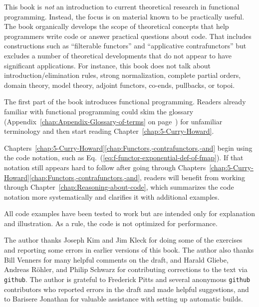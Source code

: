 This book is \emph{not} an introduction to current theoretical research
in functional programming. Instead, the focus is on material known
to be practically useful. The book organically develops the scope
of theoretical concepts that help programmers write code or answer
practical questions about code. That includes constructions such as
\textsf{``}filterable functors\textsf{''} and \textsf{``}applicative contrafunctors\textsf{''} but
excludes a number of theoretical developments that do not appear to
have significant applications. For instance, this book does not talk
about introduction/elimination rules, strong normalization, complete
partial orders, domain theory, model theory, adjoint functors, co-ends,
pullbacks, or topoi.

The first part of the book introduces functional programming. Readers
already familiar with functional programming could skim the glossary
(Appendix~\ref{chap:Appendix-Glossary-of-terms} on page~\pageref{chap:Appendix-Glossary-of-terms})
for unfamiliar terminology and then start reading Chapter~\ref{chap:5-Curry-Howard}.

Chapters~\ref{chap:5-Curry-Howard}\textendash \ref{chap:Functors,-contrafunctors,-and}
begin using the code notation, such as Eq.~(\ref{eq:f-functor-exponential-def-of-fmap}).
If that notation still appears hard to follow after going through
Chapters~\ref{chap:5-Curry-Howard}\textendash \ref{chap:Functors,-contrafunctors,-and},
readers will benefit from working through Chapter~\ref{chap:Reasoning-about-code},
which summarizes the code notation more systematically and clarifies
it with additional examples.

All code examples have been tested to work but are intended only for
explanation and illustration. As a rule, the code is not optimized
for performance.

The author thanks Joseph Kim and Jim Kleck for doing some of the exercises
and reporting some errors in earlier versions of this book. The author
also thanks Bill Venners for many helpful comments on the draft, and
Harald Gliebe, Andreas R\"ohler, and Philip Schwarz for contributing
corrections to the text via \texttt{github}. The author is grateful
to Frederick Pitts and several anonymous \texttt{github} contributors
who reported errors in the draft and made helpful suggestions, and
to Barisere Jonathan for valuable assistance with setting up automatic
builds.

